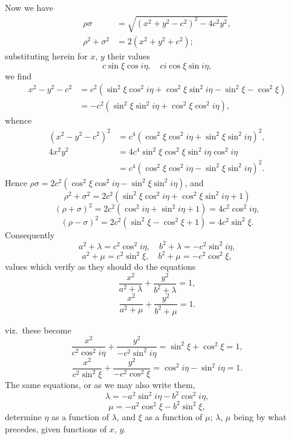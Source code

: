 \documentclass[11pt,a4paper]{article}
\begin{document}
Now we have
\begin{align*}
\rho\sigma &= \sqrt{(x^{2} + y^{2} - c^{2})^{2} - 4c^{2}y^{2}},\\
\rho^{2} + \sigma^{2} &= 2(x^{2} + y^{2} + c^{2});
\end{align*}
substituting herein for $x$, $y$ their values
\[
c\sin\xi\cos i\eta,\quad ci\cos\xi\sin i\eta,
\]
we find
\begin{align*}
x^{2} - y^{2} - c^{2} &= c^{2}(\sin^{2}\xi\cos^{2}i\eta + \cos^{2}\xi\sin^{2}i\eta - \sin^{2}\xi - \cos^{2}\xi)\\
&= -c^{2}(\sin^{2}\xi\sin^{2}i\eta + \cos^{2}\xi\cos^{2}i\eta),
\end{align*}
whence
\begin{align*}
(x^{2} - y^{2} - c^{2})^{2} &= c^{4}(\cos^{2}\xi\cos^{2}i\eta + \sin^{2}\xi\sin^{2}i\eta)^{2},\\
4x^{2}y^{2} &= 4c^{4}\sin^{2}\xi\cos^{2}\xi\sin^{2}i\eta\cos^{2}i\eta\\
&= c^{4}(\cos^{2}\xi\cos^{2}i\eta - \sin^{2}\xi\sin^{2}i\eta)^{2}.
\end{align*}
Hence $\rho\sigma = 2c^{2}(\cos^{2}\xi\cos^{2}i\eta - \sin^{2}\xi\sin^{2}i\eta)$,
and
\[
\rho^{2} + \sigma^{2} = 2c^{2}(\sin^{2}\xi\cos^{2}i\eta + \cos^{2}\xi\sin^{2}i\eta + 1)
\]
\[
(\rho + \sigma)^{2} = 2c^{2}(\cos^{2}i\eta + \sin^{2}i\eta + 1) = 4c^{2}\cos^{2}i\eta,
\]
\[
(\rho - \sigma)^{2} = 2c^{2}(\sin^{2}\xi - \cos^{2}\xi + 1) = 4c^{2}\sin^{2}\xi.
\]
Consequently
\[
a^{2} + \lambda = c^{2}\cos^{2}i\eta,\quad b^{2} + \lambda = -c^{2}\sin^{2}i\eta,
\]
\[
a^{2} + \mu = c^{2}\sin^{2}\xi,\quad b^{2} + \mu = -c^{2}\cos^{2}\xi,
\]
values which verify as they should do the equations
\[
\frac{x^{2}}{a^{2} + \lambda} + \frac{y^{2}}{b^{2} + \lambda} = 1,
\]
\[
\frac{x^{2}}{a^{2} + \mu} + \frac{y^{2}}{b^{2} + \mu} = 1.
\]

\newpage


\noindent viz.\ these become
\[
\frac{x^{2}}{c^{2}\cos^{2}i\eta} + \frac{y^{2}}{-c^{2}\sin^{2}i\eta} = \sin^{2}\xi + \cos^{2}\xi = 1,
\]
\[
\frac{x^{2}}{c^{2}\sin^{2}\xi} + \frac{y^{2}}{-c^{2}\cos^{2}\xi} = \cos^{2}i\eta - \sin^{2}i\eta = 1.
\]
The same equations, or as we may also write them,
\[
\lambda = -a^{2}\sin^{2}i\eta - b^{2}\cos^{2}i\eta,
\]
\[
\mu = -a^{2}\cos^{2}\xi - b^{2}\sin^{2}\xi,
\]
determine $\eta$ as a function of $\lambda$, and $\xi$ as a function of $\mu$; $\lambda$, $\mu$ being by what precedes, given functions of $x$, $y$.
\end{document}
